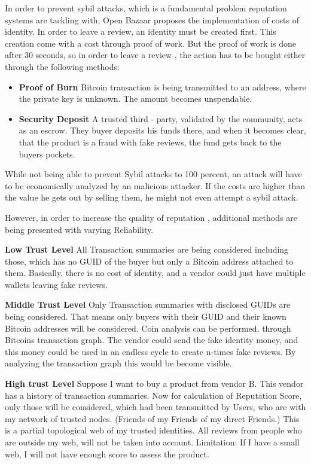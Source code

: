 In order to prevent sybil attacks, which is a fundamental problem reputation systems are tackling with, Open Bazaar proposes
the implementation of costs of identity. 
In order to leave a review, an identity must be created first. This creation come with a cost through proof of work. 
But the proof of work is done after 30 seconds, so in order to leave a review , the action has to be bought either through the following methods: 
\begin{itemize}
    \item \textbf {Proof of Burn}
    Bitcoin transaction is being transmitted to an address, where the private key is unknown. The amount becomes unspendable.
    \item \textbf {Security Deposit}
    A trusted third - party, validated by the community, acts as an escrow. They buyer deposits his funds there, and when it becomes clear, that the product is a fraud with fake reviews, the fund gets back to the buyers pockets. 
    
\end{itemize}

While not being able to prevent Sybil attacks to 100 percent, an attack will have to be economically analyzed by an malicious attacker. 
If the costs are higher than the value he gets out by selling them, he might not even attempt a sybil attack. 

However, in order to increase the quality of reputation , additional methods are being presented with varying Reliability. 

\textbf{Low Trust Level}
All Transaction summaries are being considered including those, which has no GUID of the buyer but only a Bitcoin address attached to them. Basically, there is no cost of identity, and a vendor could just have multiple wallets leaving fake reviews. 

\textbf{Middle Trust Level}
Only Transaction summaries with disclosed GUIDs are being considered. That means only buyers with their GUID and their known Bitcoin addresses will be considered. Coin analysis can be performed, through Bitcoins transaction graph. 
The vendor could send the fake identity money, and this money could be used in an endless cycle to create n-times fake reviews. 
By analyzing the transaction graph this would be become visible. 

\textbf{High trust Level}
Suppose I want to buy a product from vendor B. 
This vendor has a history of transaction summaries. 
Now for calculation of Reputation Score, only those will be considered, which had been transmitted by Users, who are with my network of trusted nodes. (Friends of my Friends of my direct Friends.) This is a partial topological web of my trusted identities. 
All reviews from people who are outside my web, will not be taken into account. 
Limitation: If I have a small web, I will not have enough score to assess the product.  












